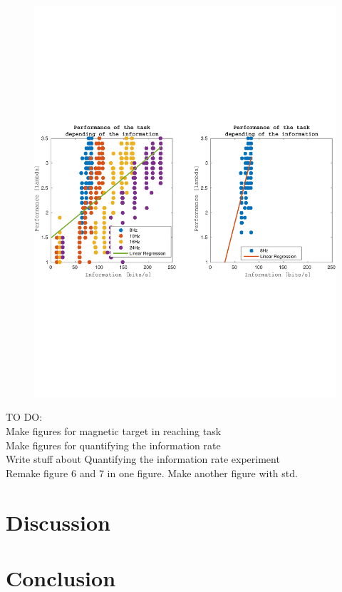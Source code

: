 \documentclass[preprint,12pt]{elsarticle}
\begin{document}
\begin{figure}[htbp]
\includegraphics[width=1\textwidth,trim={0cm 7.5cm 0cm 7.5cm},clip]{figures/scatter_bits_sec_lambda_nr.pdf}
\caption{}
\label{fig:scatterbitsnr}
\end{figure}

TO DO:\\
Make figures for magnetic target in reaching task\\
Make figures for quantifying the information rate\\
Write stuff about Quantifying the information rate experiment\\
Remake figure 6 and 7 in one figure. Make another figure with std.\\



\section{Discussion}
\section{Conclusion}
\end{document}
